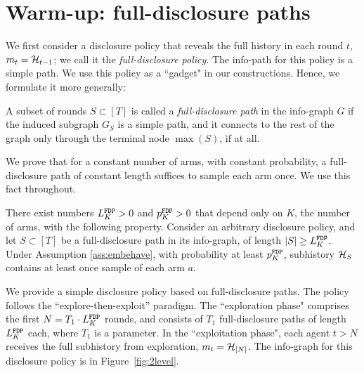 \section{Warm-up: full-disclosure paths}
\label{sec:warmup}
We first consider a disclosure policy that reveals the full history in each round $t$, \ie $m_t=\mathcal{H}_{t-1}$; we call it the \emph{full-disclosure policy}. The info-path for this policy is a simple path. We use this policy as a ``gadget" in our constructions. Hence, we formulate it more generally:

\begin{definition}
A subset of rounds $S\subset [T]$ is called a \emph{full-disclosure path} in the  info-graph $G$ if the induced subgraph $G_S$ is a simple path, and it connects to the rest of the graph only through the terminal node $\max(S)$, if at all.
\end{definition}

We prove that for a constant number of arms, with constant probability, a full-disclosure path of constant length suffices to sample each arm once. We use this fact throughout.

\begin{lemma}\label{lem:greedy}
There exist numbers $L^\mathtt{FDP}_K>0$ and $p^\mathtt{FDP}_K>0$ that depend only on $K$, the number of arms, with the following property. Consider an arbitrary disclosure policy, and let $S\subset [T]$ be a full-disclosure path in its info-graph, of length $|S|\geq L^\mathtt{FDP}_K$. Under Assumption \ref{ass:embehave}, with probability at least $p^\mathtt{FDP}_K$, subhistory $\mathcal{H}_{S}$ contains at least once sample of each arm $a$.
\end{lemma}


We provide a simple disclosure policy based on full-disclosure paths. The policy follows the ``explore-then-exploit'' paradigm. The ``exploration phase" comprises the first $N = T_1\cdot L^\mathtt{FDP}_K$ rounds, and consists of $T_1$ full-disclosure paths of length $L^\mathtt{FDP}_K$ each, where $T_1$ is a parameter. In the ``exploitation phase", each agent $t>N$ receives the full subhistory from exploration, \ie $m_t = \mathcal{H}_{[N]}$. The info-graph for this disclosure policy is in Figure~\ref{fig:2level}.

